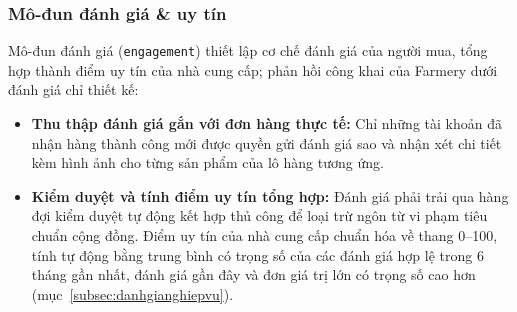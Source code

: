 \subsubsection*{Mô-đun đánh giá \& uy tín}
Mô-đun đánh giá (\texttt{engagement}) thiết lập cơ chế đánh giá của người mua, tổng hợp thành điểm uy tín của nhà cung cấp; phản hồi công khai của Farmery dưới đánh giá chỉ thiết kế:
\begin{itemize}
    \item \textbf{Thu thập đánh giá gắn với đơn hàng thực tế:} Chỉ những tài khoản đã nhận hàng thành công mới được quyền gửi đánh giá sao và nhận xét chi tiết kèm hình ảnh cho từng sản phẩm của lô hàng tương ứng.
    \item \textbf{Kiểm duyệt và tính điểm uy tín tổng hợp:} Đánh giá phải trải qua hàng đợi kiểm duyệt tự động kết hợp thủ công để loại trừ ngôn từ vi phạm tiêu chuẩn cộng đồng. Điểm uy tín của nhà cung cấp chuẩn hóa về thang 0--100, tính tự động bằng trung bình có trọng số của các đánh giá hợp lệ trong 6 tháng gần nhất, đánh giá gần đây và đơn giá trị lớn có trọng số cao hơn (mục~\ref{subsec:danhgianghiepvu}).
\end{itemize}

